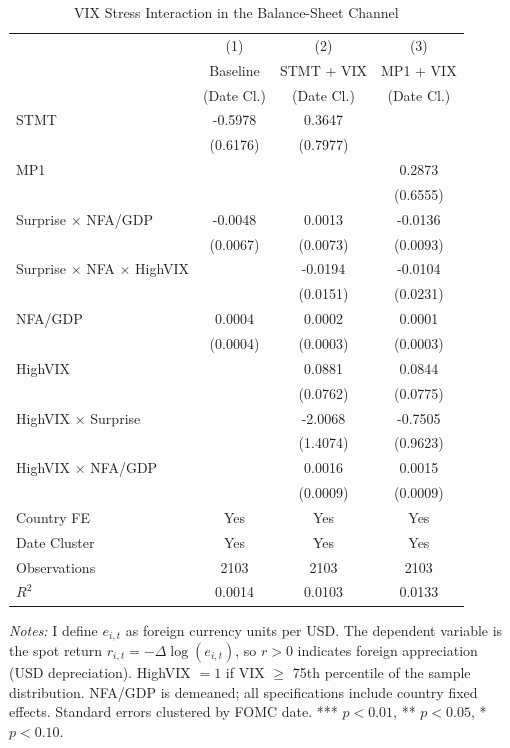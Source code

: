 \begin{table}[htbp]
\centering
\caption{VIX Stress Interaction in the Balance-Sheet Channel}
\label{tab:vix_stress}
\begin{tabular}{lccc}
\hline\hline
 & (1) & (2) & (3) \\
 & Baseline & STMT + VIX & MP1 + VIX \\
 & (Date Cl.) & (Date Cl.) & (Date Cl.) \\
\hline
STMT & -0.5978 & 0.3647 & \\
 & (0.6176) & (0.7977) & \\
MP1 & & & 0.2873 \\
 & & & (0.6555) \\
Surprise $\times$ NFA/GDP & -0.0048 & 0.0013 & -0.0136 \\
 & (0.0067) & (0.0073) & (0.0093) \\
Surprise $\times$ NFA $\times$ HighVIX & & -0.0194 & -0.0104 \\
 & & (0.0151) & (0.0231) \\
NFA/GDP & 0.0004 & 0.0002 & 0.0001 \\
 & (0.0004) & (0.0003) & (0.0003) \\
HighVIX & & 0.0881 & 0.0844 \\
 & & (0.0762) & (0.0775) \\
HighVIX $\times$ Surprise & & -2.0068 & -0.7505 \\
 & & (1.4074) & (0.9623) \\
HighVIX $\times$ NFA/GDP & & 0.0016 & 0.0015 \\
 & & (0.0009) & (0.0009) \\
\hline
Country FE & Yes & Yes & Yes \\
Date Cluster & Yes & Yes & Yes \\
Observations & 2103 & 2103 & 2103 \\
$R^2$ & 0.0014 & 0.0103 & 0.0133 \\
\hline\hline
\end{tabular}
\begin{tablenotes}
\small
\item \textit{Notes:} I define $e_{i,t}$ as foreign currency units per USD.
The dependent variable is the spot return $r_{i,t} = -\Delta\log(e_{i,t})$,
so $r > 0$ indicates foreign appreciation (USD depreciation).
HighVIX $= 1$ if VIX $\geq$ 75th percentile of the sample distribution.
NFA/GDP is demeaned; all specifications include country fixed effects.
Standard errors clustered by FOMC date.
*** $p<0.01$, ** $p<0.05$, * $p<0.10$.
\end{tablenotes}
\end{table}
